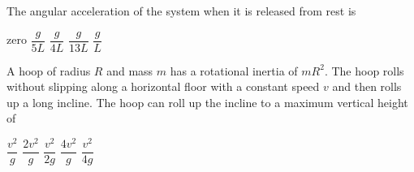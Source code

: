 \documentclass{../../oss-apphys-exam}
\begin{document}
\begin{questions}
  \question The angular acceleration of the system when it is released from
  rest is
  \begin{choices}
    \choice zero
    \choice $\dfrac g{5L}$
    \choice $\dfrac g{4L}$
    \choice $\dfrac g{13L}$
    \choice $\dfrac gL$
  \end{choices}
  \label{lightrod2}
  
  \question A hoop of radius $R$ and mass $m$ has a rotational inertia of
  $mR^2$. The hoop rolls without slipping along a horizontal floor with a
  constant speed $v$ and then rolls up a long incline. The hoop can roll up the
  incline to a maximum vertical height of
  \begin{center}
  \end{center}
  \begin{choices}
    \choice$\dfrac{v^2}{g}$
    \choice$\dfrac{2v^2}{g}$
    \choice$\dfrac{v^2}{2g}$
    \choice$\dfrac{4v^2}{g}$
    \choice$\dfrac{v^2}{4g}$
  \end{choices}

  

\end{questions}
\end{document}
